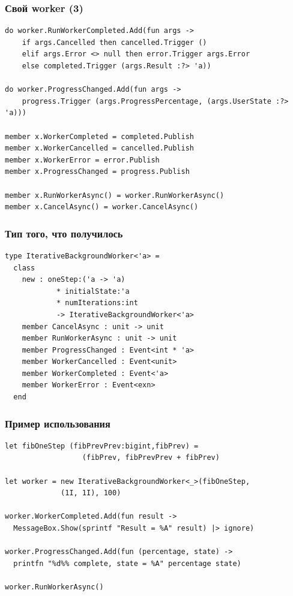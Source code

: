 \documentclass[xetex,mathserif,serif]{beamer}
\begin{document}
	\begin{frame}[fragile]
		\frametitle{Свой worker (3)}
		\begin{verbatim}
do worker.RunWorkerCompleted.Add(fun args ->
    if args.Cancelled then cancelled.Trigger ()
    elif args.Error <> null then error.Trigger args.Error
    else completed.Trigger (args.Result :?> 'a))

do worker.ProgressChanged.Add(fun args ->
    progress.Trigger (args.ProgressPercentage, (args.UserState :?> 'a)))

member x.WorkerCompleted = completed.Publish
member x.WorkerCancelled = cancelled.Publish
member x.WorkerError = error.Publish
member x.ProgressChanged = progress.Publish

member x.RunWorkerAsync() = worker.RunWorkerAsync()
member x.CancelAsync() = worker.CancelAsync()
		\end{verbatim}
\end{frame}

	\begin{frame}[fragile]
		\frametitle{Тип того, что получилось}
		\begin{verbatim}
type IterativeBackgroundWorker<'a> =
  class
    new : oneStep:('a -> 'a) 
            * initialState:'a 
            * numIterations:int 
            -> IterativeBackgroundWorker<'a>
    member CancelAsync : unit -> unit
    member RunWorkerAsync : unit -> unit
    member ProgressChanged : Event<int * 'a>
    member WorkerCancelled : Event<unit>
    member WorkerCompleted : Event<'a>
    member WorkerError : Event<exn>
  end
		\end{verbatim}
\end{frame}

	\begin{frame}[fragile]
		\frametitle{Пример использования}
		\begin{verbatim}
let fibOneStep (fibPrevPrev:bigint,fibPrev) = 
                  (fibPrev, fibPrevPrev + fibPrev)

let worker = new IterativeBackgroundWorker<_>(fibOneStep,
             (1I, 1I), 100)

worker.WorkerCompleted.Add(fun result ->
  MessageBox.Show(sprintf "Result = %A" result) |> ignore)

worker.ProgressChanged.Add(fun (percentage, state) ->
  printfn "%d%% complete, state = %A" percentage state)

worker.RunWorkerAsync()
		\end{verbatim}
\end{frame}
\end{document}
